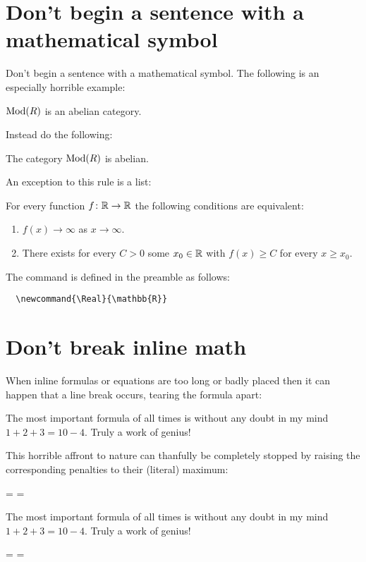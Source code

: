 \documentclass[a4paper, 10pt, abstract=on, headings=standardclasses]{scrartcl}
\begin{document}
\section{Don’t begin a sentence with a mathematical symbol}

Don’t begin a sentence with a mathematical symbol.
The following is an especially horrible example:
\begin{LTXexample}[pos = b]
  \begin{theorem}
    $\operatorname{Mod}(R)$ is an abelian category.
  \end{theorem}
\end{LTXexample}
Instead do the following:
\begin{LTXexample}[pos = b]
  \begin{theorem}
    The category $\operatorname{Mod}(R)$ is abelian.
  \end{theorem}
\end{LTXexample}
An exception to this rule is a list:
\begin{LTXexample}[pos = b]
  For every function $f \colon \Real \to \Real$ the following conditions are equivalent:
  \begin{enumerate}
    \item
      $f(x) \to \infty$ as $x \to \infty$.
    \item
      There exists for every $C > 0$ some $x_0 \in \Real$ with $f(x) \geq C$ for every $x \geq x_0$.
  \end{enumerate}
\end{LTXexample}
The command  is defined in the preamble as follows:
\begin{lstlisting}
  \newcommand{\Real}{\mathbb{R}}
\end{lstlisting}




\section{Don’t break inline math}
\label{breaking inline math}

When inline formulas or equations are too long or badly placed then it can happen that a line break occurs, tearing the formula apart:
\begin{LTXexample}[pos = b]
  The most important formula of all times is without any doubt in my mind $1 + 2 + 3 = 10 - 4$.
  Truly a work of genius!
\end{LTXexample}
This horrible affront to nature can thanfully be completely stopped by raising the corresponding penalties to their (literal) maximum:
\begin{LTXexample}[pos = b]
  \binoppenalty = \maxdimen
  \relpenalty = \maxdimen
  
  The most important formula of all times is without any doubt in my mind $1 + 2 + 3 = 10 - 4$.
  Truly a work of genius!
\end{LTXexample}
\binoppenalty = \maxdimen
\relpenalty = \maxdimen
\end{document}
